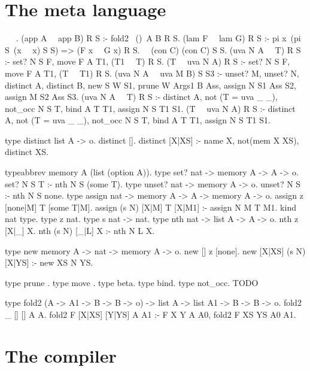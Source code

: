 \section{The meta language}
\begin{elpicode}
~  ~.
(app A ~\Ue~app B) R S :- fold2 ~(\Ue)~A B R S.
(lam F ~\Ue~lam G) R S :- pi x\ (pi S\ (x ~\Ue~x) S S) => (F x ~\Ue~G x) R S.
~\Ue~(con C) (con C) S S.
(uva N A ~\Ue~T) R S :- set? N S F, move F A T1, (T1 ~\Ue~T) R S.
(T ~\Ue~uva N A) R S :- set? N S F, move F A T1, (T ~\Ue~T1) R S.
(uva N A ~\Ue~uva M B) S S3 :-  unset? M, unset? N,
  distinct A, distinct B, 
  new S W S1, prune W Args1 B Ass, 
  assign N S1 Ass S2, assign M S2 Ass S3.
(uva N A ~\Ue~T) R S :- distinct A, not (T = uva _ _), not_occ N S T,  
  bind A T T1, assign N S T1 S1.
(T ~\Ue~uva N A) R S :- distinct A, not (T = uva _ _), not_occ N S T, 
  bind A T T1, assign N S T1 S1. 
      
type distinct list A -> o.
distinct [].
distinct [X|XS] :- name X, not(mem X XS),
distinct XS.

typeabbrev memory A (list (option A)).
type set? nat -> memory A -> A -> o.
set? N S T :- nth N S (some T).
type unset? nat -> memory A -> o.
unset? N S :- nth N S none.
type assign nat -> memory A -> A -> memory A -> o.
assign z [none|M] T [some T|M].
assign (s N) [X|M] T [X|M1] :- assign N M T M1. 
kind nat type.
type z nat.
type s nat -> nat.
type nth nat -> list A -> A -> o.
nth z [X|_] X.
nth (s N) [_|L] X :- nth N L X.

type new memory A -> nat -> memory A -> o.
new [] z [none].
new [X|XS] (s N) [X|YS] :- new XS N YS.

type prune .
type move .
type beta.
type bind.
type not_occ.
TODO

type fold2 (A -> A1 -> B -> B -> o) -> list A -> list A1 -> B -> B -> o.
fold2 _ [] [] A A.
fold2 F [X|XS] [Y|YS] A A1 :- F X Y A A0, fold2 F XS YS A0 A1.

\end{elpicode}

\section{The compiler}

